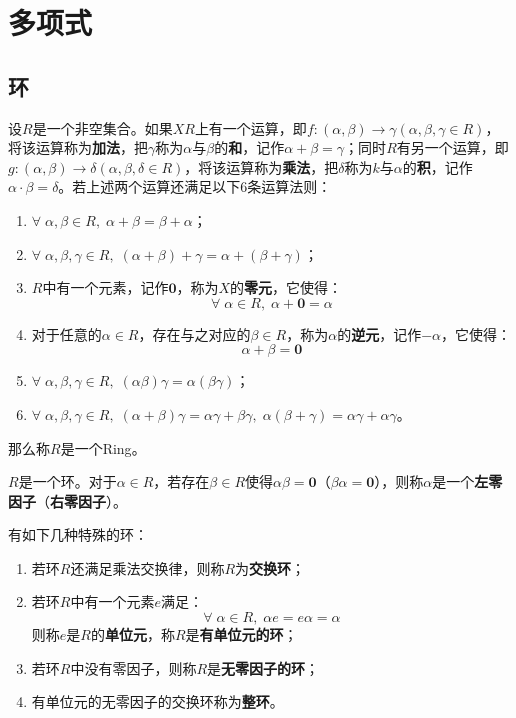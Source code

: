 \section{多项式}

\subsection{环}
\begin{definition}
	设$R$是一个非空集合。如果$XR$上有一个运算，即$f:(\alpha,\beta)\rightarrow\gamma(\alpha,\beta,\gamma\in R)$，将该运算称为\textbf{加法}，把$\gamma$称为$\alpha$与$\beta$的\textbf{和}，记作$\alpha+\beta=\gamma$；同时$R$有另一个运算，即$g:(\alpha,\beta)\rightarrow\delta(\alpha,\beta,\delta\in R)$，将该运算称为\textbf{乘法}，把$\delta$称为$k$与$\alpha$的\textbf{积}，记作$\alpha\cdot\beta=\delta$。若上述两个运算还满足以下$6$条运算法则：
	\begin{enumerate}
		\item $\forall\;\alpha,\beta\in R,\;\alpha+\beta=\beta+\alpha$；
		\item $\forall\;\alpha,\beta,\gamma\in R,\;(\alpha+\beta)+\gamma=\alpha+(\beta+\gamma)$；
		\item $R$中有一个元素，记作$\mathbf{0}$，称为$X$的\textbf{零元}，它使得：
		\begin{equation*}
			\forall\;\alpha\in R,\;\alpha+\mathbf{0}=\alpha
		\end{equation*}
		\item 对于任意的$\alpha\in R$，存在与之对应的$\beta\in R$，称为$\alpha$的\textbf{逆元}，记作$-\alpha$，它使得：
		\begin{equation*}
			\alpha+\beta=\mathbf{0}
		\end{equation*}
		\item $\forall\;\alpha,\beta,\gamma\in R,\;(\alpha\beta)\gamma=\alpha(\beta\gamma)$；
		\item $\forall\;\alpha,\beta,\gamma\in R,\;(\alpha+\beta)\gamma=\alpha\gamma+\beta\gamma,\;\alpha(\beta+\gamma)=\alpha\gamma+\alpha\gamma$。
	\end{enumerate}
	那么称$R$是一个\gls{Ring}。
\end{definition}
\begin{definition}
	$R$是一个环。对于$\alpha\in R$，若存在$\beta\in R$使得$\alpha\beta=\mathbf{0}$（$\beta\alpha=\mathbf{0}$），则称$\alpha$是一个\textbf{左零因子}（\textbf{右零因子}）。
\end{definition}
\begin{definition}
	有如下几种特殊的环：
	\begin{enumerate}
		\item 若环$R$还满足乘法交换律，则称$R$为\textbf{交换环}；
		\item 若环$R$中有一个元素$e$满足：
		\begin{equation*}
			\forall\;\alpha\in R,\;\alpha e=e\alpha=\alpha
		\end{equation*}
		则称$e$是$R$的\textbf{单位元}，称$R$是\textbf{有单位元的环}；
		\item 若环$R$中没有零因子，则称$R$是\textbf{无零因子的环}；
		\item 有单位元的无零因子的交换环称为\textbf{整环}。
	\end{enumerate}
\end{definition}

